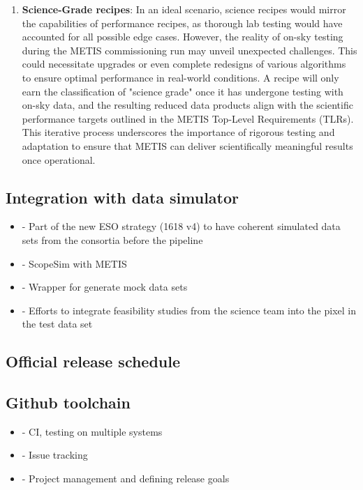 \documentclass[a4paper]{spie}  %
\begin{document}
\begin{enumerate}
     \item \textbf{Science-Grade recipes}: In an ideal scenario, science recipes would mirror the capabilities of performance recipes, as thorough lab testing would have accounted for all possible edge cases. However, the reality of on-sky testing during the METIS commissioning run may unveil unexpected challenges. This could necessitate upgrades or even complete redesigns of various algorithms to ensure optimal performance in real-world conditions. A recipe will only earn the classification of "science grade" once it has undergone testing with on-sky data, and the resulting reduced data products align with the scientific performance targets outlined in the METIS Top-Level Requirements (TLRs). This iterative process underscores the importance of rigorous testing and adaptation to ensure that METIS can deliver scientifically meaningful results once operational. 
 \end{enumerate}





\subsection{Integration with data simulator}
\label{ssec:dev_scopesim}

 \begin{itemize}
     \item - Part of the new ESO strategy (1618 v4) to have coherent simulated data sets from the consortia before the pipeline
     \item - ScopeSim with METIS
     \item - Wrapper for generate mock data sets
     \item - Efforts to integrate feasibility studies from the science team into the pixel in the test data set
 \end{itemize}

 
\subsection{Official release schedule}
\label{ssec:dev_releases}



\subsection{Github toolchain}
\label{ssec:dev_testing}
 \begin{itemize}
     \item - CI, testing on multiple systems
     \item - Issue tracking
     \item - Project management and defining release goals
 \end{itemize}
\end{document}

